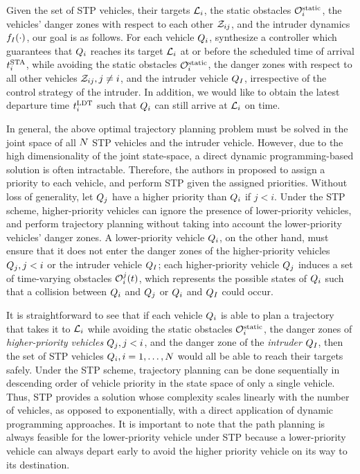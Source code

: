 Given the set of STP vehicles, their targets $\mathcal{L}_i$, the static obstacles $\mathcal{O}^\text{static}_i$, the vehicles' danger zones with respect to each other $\mathcal{Z}_{ij}$, and the intruder dynamics $f_I(\cdot)$, our goal is as follows. For each vehicle $Q_i$, synthesize a controller which guarantees that $Q_i$ reaches its target $\mathcal{L}_i$ at or before the scheduled time of arrival $t^\text{STA}_i$, while avoiding the static obstacles $\mathcal{O}^\text{static}_i$, the danger zones with respect to all other vehicles $\mathcal{Z}_{ij}, j\neq i$, and the intruder vehicle $Q_{I}$, irrespective of the control strategy of the intruder. In addition, we would like to obtain the latest departure time $t^\text{LDT}_i$ such that $Q_i$ can still arrive at $\mathcal{L}_i$ on time.

In general, the above optimal trajectory planning problem must be solved in the joint space of all $N$ STP vehicles and the intruder vehicle. However, due to the high dimensionality of the joint state-space, a direct dynamic programming-based solution is often intractable. Therefore, the authors in \cite{Chen15c} proposed to assign a priority to each vehicle, and perform STP given the assigned priorities. Without loss of generality, let $Q_j$ have a higher priority than $Q_i$ if $j<i$. Under the STP scheme, higher-priority vehicles can ignore the presence of lower-priority vehicles, and perform trajectory planning without taking into account the lower-priority vehicles' danger zones. A lower-priority vehicle $Q_i$, on the other hand, must ensure that it does not enter the danger zones of the higher-priority vehicles $Q_j, j<i$ or the intruder vehicle $Q_{I}$; each higher-priority vehicle $Q_j$ induces a set of time-varying obstacles $\mathcal{O}_i^j(t)$, which represents the possible states of $Q_i$ such that a collision between $Q_i$ and $Q_j$ or $Q_i$ and $Q_{I}$ could occur.

It is straightforward to see that if each vehicle $Q_i$ is able to plan a trajectory that takes it to $\mathcal{L}_i$ while avoiding the static obstacles $\mathcal{O}^\text{static}_i$, the danger zones of \textit{higher-priority vehicles} $Q_j, j<i$, and the danger zone of the \textit{intruder} $Q_{I}$, then the set of STP vehicles $Q_i, i=1,\ldots,N$ would all be able to reach their targets safely. Under the STP scheme, trajectory planning can be done sequentially in descending order of vehicle priority in the state space of only a single vehicle. Thus, STP provides a solution whose complexity scales linearly with the number of vehicles, as opposed to exponentially, with a direct application of dynamic programming approaches. It is important to note that the path planning is always feasible for the lower-priority vehicle under STP because a lower-priority vehicle can always depart early to avoid the higher priority vehicle on its way to its destination.

